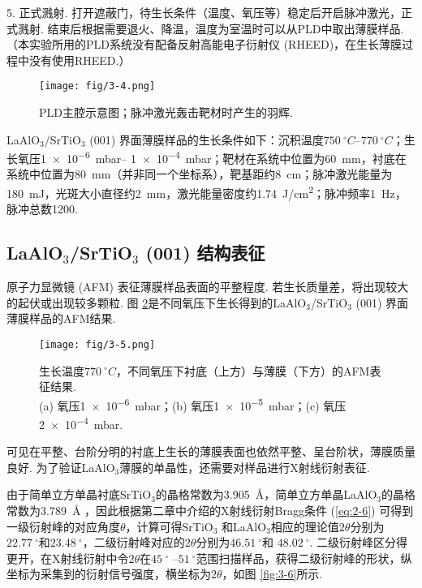 \documentclass[12pt,a4paper,openany,twoside,UTF-8]{book}
\begin{document}
5. 正式溅射. 打开遮蔽门，待生长条件（温度、氧压等）稳定后开启脉冲激光，正式溅射. 结束后根据需要退火、降温，温度为室温时可以从PLD中取出薄膜样品. （本实验所用的PLD系统没有配备反射高能电子衍射仪 (RHEED)，在生长薄膜过程中没有使用RHEED.）

\begin{figure}[htbp]
\centering
\texttt{[image: fig/3-4.png]}
\caption{PLD主腔示意图；脉冲激光轰击靶材时产生的羽辉.}
\label{fig:3-4} 
\end{figure}

LaAlO$_3$/SrTiO$_3$ (001) 界面薄膜样品的生长条件如下：沉积温度$\SI{750}{^\circ C}$–$\SI{770}{^\circ C}$；生长氧压\SI{1e-6}{mbar}– \SI{1e-4}{mbar}；靶材在系统中位置为\SI{60}{mm}，衬底在系统中位置为\SI{80}{mm}（并非同一个坐标系），靶基距约\SI{8}{cm}；脉冲激光能量为\SI{180}{mJ}，光斑大小直径约\SI{2}{mm}，激光能量密度约\SI{1.74}{J/cm^2}；脉冲频率\SI{1}{Hz}，脉冲总数1200. 

\subsection{LaAlO$_3$/SrTiO$_3$ (001) 结构表征}
原子力显微镜 (AFM) 表征薄膜样品表面的平整程度. 若生长质量差，将出现较大的起伏或出现较多颗粒. 图 \ref{fig:3-5}是不同氧压下生长得到的LaAlO$_3$/SrTiO$_3$ (001) 界面薄膜样品的AFM结果.

\begin{figure}[htbp]
\centering
\texttt{[image: fig/3-5.png]}
\caption{生长温度$\SI{770}{^\circ C}$，不同氧压下衬底（上方）与薄膜（下方）的AFM表征结果.\\
(a) 氧压\SI{1e-6}{mbar}；(b) 氧压\SI{1e-5}{mbar}；(c) 氧压\SI{2e-4}{mbar}.}
\label{fig:3-5} 
\end{figure}

可见在平整、台阶分明的衬底上生长的薄膜表面也依然平整、呈台阶状，薄膜质量良好. 为了验证LaAlO$_3$薄膜的单晶性，还需要对样品进行X射线衍射表征.

由于简单立方单晶衬底SrTiO$_3$的晶格常数为\SI{3.905}{Å}，简单立方单晶LaAlO$_3$的晶格常数为\SI{3.789}{Å} \cite{ref7}，因此根据第二章中介绍的X射线衍射Bragg条件 (\ref{eq:2-6}) 可得到一级衍射峰的对应角度$\theta$，计算可得SrTiO$_3$ 和LaAlO$_3$相应的理论值$2\theta$分别为$\SI{22.77}{^\circ}$和$\SI{23.48}{^\circ}$，二级衍射峰对应的$2\theta$分别为$\SI{46.51}{^\circ}$和 $\SI{48.02}{^\circ}$. 二级衍射峰区分得更开，在X射线衍射中令$2\theta$在$\SI{45}{^\circ}$ –$\SI{51}{^\circ}$范围扫描样品，获得二级衍射峰的形状，纵坐标为采集到的衍射信号强度，横坐标为$2\theta$，如图 \ref{fig:3-6}所示.
\end{document}
